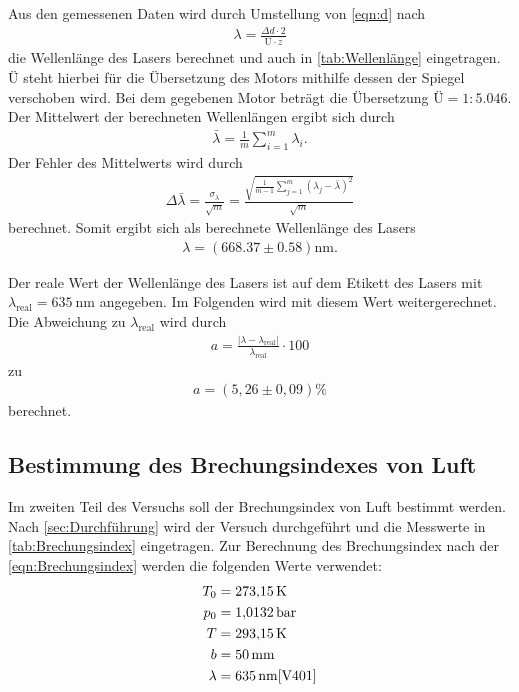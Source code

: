 Aus den gemessenen Daten wird durch Umstellung von \autoref{eqn:d} nach
\begin{align*}
  \lambda = \frac{\Delta d \cdot 2}{ Ü \cdot z}
\end{align*}
die Wellenlänge des Lasers berechnet und auch in \autoref{tab:Wellenlänge} eingetragen.
$Ü$ steht hierbei für die Übersetzung des Motors mithilfe dessen der Spiegel verschoben wird.
Bei dem gegebenen Motor beträgt die Übersetzung $Ü= 1:5.046$. 
Der Mittelwert der berechneten Wellenlängen ergibt sich durch
\begin{align}
  \bar{\lambda}=\frac{1}{m} \sum_{i=1}^m \lambda_i.
  \label{eqn:Mittelwert}
\end{align}
Der Fehler des Mittelwerts wird durch 
\begin{align}
  \Delta \bar{\lambda}= \frac{\sigma_\lambda}{\sqrt{m}} = \frac{\sqrt{\frac{1}{m-1}\sum_{j=1}^m (\lambda_j-\bar{\lambda})^2}}{\sqrt{m}}
  \label{eqn:Fehler}
\end{align}
berechnet.
Somit ergibt sich als berechnete Wellenlänge des Lasers
\begin{align*}
  \lambda= (668.37 \pm 0.58 )\si{\nano\meter}.
\end{align*}

Der reale Wert der Wellenlänge des Lasers ist auf dem Etikett des Lasers mit $\lambda_{\text{real}}=\qty{635}{\nano\meter}$ angegeben.
Im Folgenden wird mit diesem Wert weitergerechnet.
Die Abweichung zu $\lambda_{\text{real}}$ wird durch
\begin{align}
  a=\frac{|\lambda-\lambda_{\text{real}}|}{\lambda_{\text{real}}}\cdot 100 \label{eqn:abweich}
\end{align}
zu
\begin{align*}
  a=(5,26 \pm 0,09) \si{\percent}
\end{align*}
berechnet.

\subsection{Bestimmung des Brechungsindexes von Luft}
\label{sub:Brechungsindex}

Im zweiten Teil des Versuchs soll der Brechungsindex von Luft bestimmt werden.
Nach \autoref{sec:Durchführung} wird der Versuch durchgeführt und die Messwerte in \autoref{tab:Brechungsindex} eingetragen.
Zur Berechnung des Brechungsindex nach der \autoref{eqn:Brechungsindex}
werden die folgenden Werte verwendet:
\begin{align*}
  T_0 &= \qty{273.15}{\kelvin}\\
  p_0 &= \qty{1.0132}{\bar}\\
  T &= \qty{293.15}{\kelvin}\\
  b &= \qty{50}{\milli\meter}\\
  \lambda &= \qty{635}{\nano\meter}
  \cite{V401}
\end{align*}

